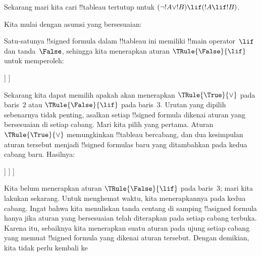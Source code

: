 \documentclass[../../../include/open-logic-section]{subfiles}
\begin{document}
\begin{ex}
Sekarang mari kita cari !!{tableau} tertutup untuk $(\lnot !A \lor !B)
\lif (!A \lif !B)$.

Kita mulai dengan asumsi yang bersesuaian:
\begin{oltableau}
  [\sFmla{\False}{(\lnot \formula{A} \lor \formula{B}) \lif
      (\formula{A} \lif \formula{B})}, just=\TAss]
\end{oltableau}
Satu-satunya !!{signed formula} dalam !!{tableau} ini memiliki
!!{main operator}~$\lif$ dan tanda~$\False$, sehingga kita menerapkan
aturan $\TRule{\False}{\lif}$ untuk memperoleh:
\begin{oltableau}
  [\sFmla{\False}{(\lnot \formula{A} \lor \formula{B})
      \lif (\formula{A} \lif \formula{B})}, just=\TAss, checked
    [\sFmla{\True}{\lnot \formula{A} \lor \formula{B}},
      just={\TRule{\False}{\lif}[1]}
      [\sFmla{\False}{(\formula{A} \lif \formula{B})},
        just={\TRule{\False}{\lif}[1]}
      ]
    ]
  ]
\end{oltableau}
Sekarang kita dapat memilih apakah akan menerapkan
$\TRule{\True}{\lor}$ pada baris~$2$ atau $\TRule{\False}{\lif}$ pada
baris~$3$. Urutan yang dipilih sebenarnya tidak penting, asalkan setiap
!!{signed formula} dikenai aturan yang bersesuaian di setiap cabang.
Mari kita pilih yang pertama. Aturan $\TRule{\True}{\lor}$ memungkinkan
!!{tableau} bercabang, dan dua kesimpulan aturan tersebut menjadi
!!{signed formula}s baru yang ditambahkan pada kedua cabang baru. Hasilnya:
\begin{oltableau}
  [\sFmla{\False}{(\lnot \formula{A} \lor \formula{B}) \lif
      (\formula{A} \lif \formula{B})}, just=\TAss, checked
    [\sFmla{\True}{\lnot \formula{A} \lor \formula{B}},
      just={\TRule{\False}{\lif}[1]}, checked
      [\sFmla{\False}{(\formula{A} \lif \formula{B})},
        just={\TRule{\False}{\lif}[1]}
        [\sFmla{\True}{\lnot \formula{A}}, just={\TRule{\True}{\lor}[2]}]
        [\sFmla{\True}{\formula{B}}, just={\TRule{\True}{\lor}[2]}]
      ]
    ]
  ]
\end{oltableau}
Kita belum menerapkan aturan $\TRule{\False}{\lif}$ pada baris~$3$;
mari kita lakukan sekarang. Untuk menghemat waktu, kita menerapkannya
pada kedua cabang. Ingat bahwa kita menuliskan tanda centang di samping
!!a{signed formula} hanya jika aturan yang bersesuaian telah diterapkan
pada setiap cabang terbuka. Karena itu, sebaiknya kita menerapkan suatu
aturan pada ujung setiap cabang yang memuat !!{signed formula} yang
dikenai aturan tersebut. Dengan demikian, kita tidak perlu kembali ke

\end{ex}
\end{document}
